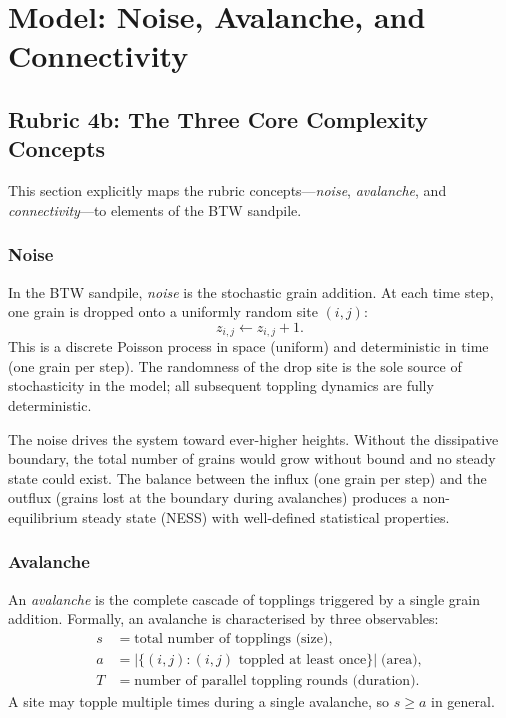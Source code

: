 \documentclass[preprint,12pt]{elsarticle}
\begin{document}
\section{Model: Noise, Avalanche, and Connectivity}
\label{sec:model}

\subsection{Rubric 4b: The Three Core Complexity Concepts}

This section explicitly maps the rubric concepts---\emph{noise},
\emph{avalanche}, and \emph{connectivity}---to elements of the BTW
sandpile.

\subsubsection*{Noise}

In the BTW sandpile, \emph{noise} is the stochastic grain addition.
At each time step, one grain is dropped onto a uniformly random site
$(i,j)$:
\begin{equation}
  z_{i,j} \gets z_{i,j} + 1.
  \label{eq:drop}
\end{equation}
This is a discrete Poisson process in space (uniform) and deterministic
in time (one grain per step).
The randomness of the drop site is the sole source of stochasticity
in the model; all subsequent toppling dynamics are fully deterministic.

The noise drives the system toward ever-higher heights.
Without the dissipative boundary, the total number of grains would
grow without bound and no steady state could exist.
The balance between the influx (one grain per step) and the outflux
(grains lost at the boundary during avalanches) produces a
non-equilibrium steady state (NESS) with well-defined statistical
properties.

\subsubsection*{Avalanche}

An \emph{avalanche} is the complete cascade of topplings triggered by
a single grain addition.
Formally, an avalanche is characterised by three observables:
\begin{align}
  s &= \text{total number of topplings (size)}, \label{eq:size}\\
  a &= |\{(i,j) : (i,j) \text{ toppled at least once}\}| \;\text{(area)}, \label{eq:area}\\
  T &= \text{number of parallel toppling rounds (duration)}. \label{eq:duration}
\end{align}
A site may topple multiple times during a single avalanche, so
$s\ge a$ in general.
\end{document}
